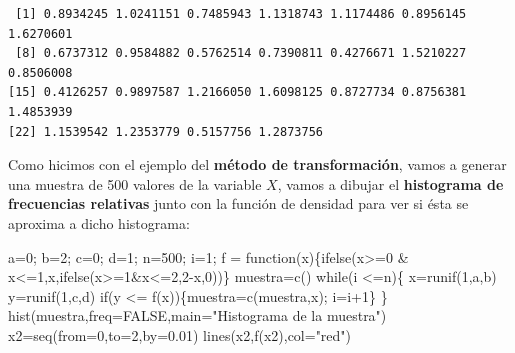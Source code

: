 \documentclass[
  letterpaper,
  DIV=11,
  numbers=noendperiod]{scrreprt}
\newenvironment{Shaded}{\begin{snugshade}}{\end{snugshade}}
\newcommand{\AttributeTok}[1]{\textcolor[rgb]{0.40,0.45,0.13}{#1}}
\newcommand{\ConstantTok}[1]{\textcolor[rgb]{0.56,0.35,0.01}{#1}}
\newcommand{\ControlFlowTok}[1]{\textcolor[rgb]{0.00,0.23,0.31}{#1}}
\newcommand{\DecValTok}[1]{\textcolor[rgb]{0.68,0.00,0.00}{#1}}
\newcommand{\FloatTok}[1]{\textcolor[rgb]{0.68,0.00,0.00}{#1}}
\newcommand{\FunctionTok}[1]{\textcolor[rgb]{0.28,0.35,0.67}{#1}}
\newcommand{\NormalTok}[1]{\textcolor[rgb]{0.00,0.23,0.31}{#1}}
\newcommand{\OtherTok}[1]{\textcolor[rgb]{0.00,0.23,0.31}{#1}}
\newcommand{\SpecialCharTok}[1]{\textcolor[rgb]{0.37,0.37,0.37}{#1}}
\newcommand{\StringTok}[1]{\textcolor[rgb]{0.13,0.47,0.30}{#1}}
\begin{document}
\begin{verbatim}
 [1] 0.8934245 1.0241151 0.7485943 1.1318743 1.1174486 0.8956145 1.6270601
 [8] 0.6737312 0.9584882 0.5762514 0.7390811 0.4276671 1.5210227 0.8506008
[15] 0.4126257 0.9897587 1.2166050 1.6098125 0.8727734 0.8756381 1.4853939
[22] 1.1539542 1.2353779 0.5157756 1.2873756
\end{verbatim}

Como hicimos con el ejemplo del \textbf{método de transformación}, vamos
a generar una muestra de 500 valores de la variable \(X\), vamos a
dibujar el \textbf{histograma de frecuencias relativas} junto con la
función de densidad para ver si ésta se aproxima a dicho histograma:

\begin{Shaded}
\begin{Highlighting}[]
\NormalTok{a}\OtherTok{=}\DecValTok{0}\NormalTok{; b}\OtherTok{=}\DecValTok{2}\NormalTok{; c}\OtherTok{=}\DecValTok{0}\NormalTok{; d}\OtherTok{=}\DecValTok{1}\NormalTok{; n}\OtherTok{=}\DecValTok{500}\NormalTok{; i}\OtherTok{=}\DecValTok{1}\NormalTok{;}
\NormalTok{f }\OtherTok{=} \ControlFlowTok{function}\NormalTok{(x)\{}\FunctionTok{ifelse}\NormalTok{(x}\SpecialCharTok{\textgreater{}=}\DecValTok{0} \SpecialCharTok{\&}\NormalTok{ x}\SpecialCharTok{\textless{}=}\DecValTok{1}\NormalTok{,x,}\FunctionTok{ifelse}\NormalTok{(x}\SpecialCharTok{\textgreater{}=}\DecValTok{1}\SpecialCharTok{\&}\NormalTok{x}\SpecialCharTok{\textless{}=}\DecValTok{2}\NormalTok{,}\DecValTok{2}\SpecialCharTok{{-}}\NormalTok{x,}\DecValTok{0}\NormalTok{))\}}
\NormalTok{muestra}\OtherTok{=}\FunctionTok{c}\NormalTok{()}
\ControlFlowTok{while}\NormalTok{(i }\SpecialCharTok{\textless{}=}\NormalTok{n)\{}
\NormalTok{  x}\OtherTok{=}\FunctionTok{runif}\NormalTok{(}\DecValTok{1}\NormalTok{,a,b)}
\NormalTok{  y}\OtherTok{=}\FunctionTok{runif}\NormalTok{(}\DecValTok{1}\NormalTok{,c,d)}
  \ControlFlowTok{if}\NormalTok{(y }\SpecialCharTok{\textless{}=} \FunctionTok{f}\NormalTok{(x))\{muestra}\OtherTok{=}\FunctionTok{c}\NormalTok{(muestra,x); i}\OtherTok{=}\NormalTok{i}\SpecialCharTok{+}\DecValTok{1}\NormalTok{\}}
\NormalTok{\}}
\FunctionTok{hist}\NormalTok{(muestra,}\AttributeTok{freq=}\ConstantTok{FALSE}\NormalTok{,}\AttributeTok{main=}\StringTok{"Histograma de la muestra"}\NormalTok{)}
\NormalTok{x2}\OtherTok{=}\FunctionTok{seq}\NormalTok{(}\AttributeTok{from=}\DecValTok{0}\NormalTok{,}\AttributeTok{to=}\DecValTok{2}\NormalTok{,}\AttributeTok{by=}\FloatTok{0.01}\NormalTok{)}
\FunctionTok{lines}\NormalTok{(x2,}\FunctionTok{f}\NormalTok{(x2),}\AttributeTok{col=}\StringTok{"red"}\NormalTok{)}
\end{Highlighting}
\end{Shaded}
\end{document}
